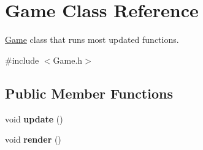 \hypertarget{class_game}{}\section{Game Class Reference}
\label{class_game}


\mbox{\hyperlink{class_game}{Game}} class that runs most updated functions.  




{\ttfamily \#include $<$Game.\+h$>$}

\subsection*{Public Member Functions}
\begin{DoxyCompactItemize}
\item 
\mbox{\label{class_game_a79df6376b332d63c9eca0dcee30305c3}} 
void {\bfseries update} ()
\item 
\mbox{\label{class_game_a15ddd769261d923827a3cdf41499c843}} 
void {\bfseries render} ()
\end{DoxyCompactItemize}
